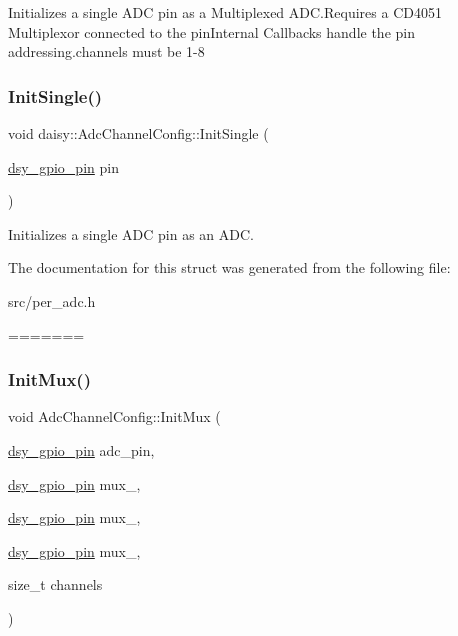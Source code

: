 Initializes a single A\+DC pin as a Multiplexed A\+D\+C.\+Requires a C\+D4051 Multiplexor connected to the pin\+Internal Callbacks handle the pin addressing.\+channels must be 1-\/8 \mbox{\label{structdaisy_1_1_adc_channel_config_a53cd44a415eef197bc2f575f91d6d6af}} 
\subsubsection{\texorpdfstring{Init\+Single()}{InitSingle()}}
{\footnotesize\ttfamily void daisy\+::\+Adc\+Channel\+Config\+::\+Init\+Single (\begin{DoxyParamCaption}\item[{\hyperlink{structdsy__gpio__pin}{dsy\+\_\+gpio\+\_\+pin}}]{pin }\end{DoxyParamCaption})}

Initializes a single A\+DC pin as an A\+DC. 

The documentation for this struct was generated from the following file\+:\begin{DoxyCompactItemize}
\item 
src/per\+\_\+adc.\+h\end{DoxyCompactItemize}
=======
\mbox{\label{structdaisy_1_1_adc_channel_config_ae825cc35459653136ccbf07d09c18fb9}} 
\subsubsection{\texorpdfstring{Init\+Mux()}{InitMux()}}
{\footnotesize\ttfamily void Adc\+Channel\+Config\+::\+Init\+Mux (\begin{DoxyParamCaption}\item[{\hyperlink{structdsy__gpio__pin}{dsy\+\_\+gpio\+\_\+pin}}]{adc\+\_\+pin,  }\item[{\hyperlink{structdsy__gpio__pin}{dsy\+\_\+gpio\+\_\+pin}}]{mux\+\_,  }\item[{\hyperlink{structdsy__gpio__pin}{dsy\+\_\+gpio\+\_\+pin}}]{mux\+\_,  }\item[{\hyperlink{structdsy__gpio__pin}{dsy\+\_\+gpio\+\_\+pin}}]{mux\+\_,  }\item[{size\+\_\+t}]{channels }\end{DoxyParamCaption})}

